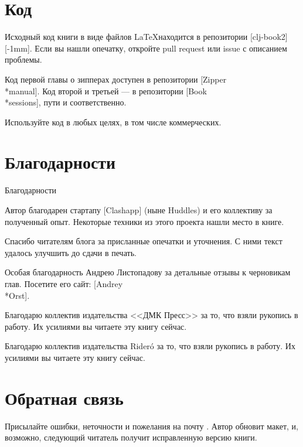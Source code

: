 \section*{Код}

Исходный код книги в виде файлов \LaTeX находится в репозитории
[clj-book2][-1mm].
Если вы нашли опечатку, откройте pull request или issue с описанием проблемы.

Код первой главы о зипперах доступен в репозитории
[Zipper\\*manual]. Код
второй и третьей — в репозитории
[Book\\*sessions],
пути  и  соответственно.

Используйте код в любых целях, в том числе коммерческих.

\section*{Благодарности}

Благодарности

Автор благодарен стартапу [Clashapp]
(ныне Huddles) и его коллективу за полученный опыт. Некоторые техники из этого
проекта нашли место в книге.

Спасибо читателям блога за присланные опечатки и уточнения. С ними текст удалось
улучшить до сдачи в печать.

Особая благодарность Андрею Листопадову за детальные отзывы к черновикам
глав. Посетите его сайт:
[Andrey\\*Orst].

\ifdmk
Благодарю коллектив издательства <<ДМК Пресс>> за то, что взяли рукопись в
работу. Их усилиями вы читаете эту книгу сейчас.
\fi

\ifridero
Благодарю коллектив издательства Rider\'{o} за то, что взяли рукопись в
работу. Их усилиями вы читаете эту книгу сейчас.
\fi

\section*{Обратная связь}

Присылайте ошибки, неточности и пожелания на почту \EMAILLINK. Автор обновит
макет, и, возможно, следующий читатель получит исправленную версию книги.
